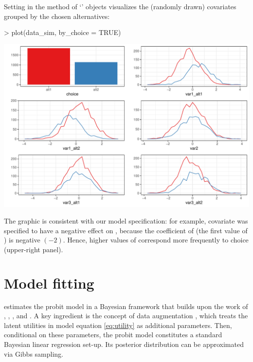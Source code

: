 \documentclass[article,shortnames]{jss}
\newcommand{\class}[1]{`\code{#1}'}
\newcommand{\fct}[1]{\code{#1()}}
\begin{document}
Setting  in the \fct{plot} method of \class{RprobitB\_data} objects visualizes the (randomly drawn) covariates grouped by the chosen alternatives:

\begin{Schunk}
\begin{Sinput}
> plot(data_sim, by_choice = TRUE)
\end{Sinput}
\end{Schunk}
\includegraphics{rprobitb_oelschlaeger_bauer-sim-data}

The graphic is consistent with our model specification: for example, covariate  was specified to have a negative effect on , because the coefficient of  (the first value of ) is negative $(-2)$. Hence, higher values of  correspond more frequently to choice  (upper-right panel).

\section{Model fitting} \label{sec:model_fitting}

 estimates the probit model in a Bayesian framework that builds upon the work of \cite{McCulloch:1994}, \cite{Nobile:1998}, \cite{Allenby:1998}, and \cite{Imai:2005}. A key ingredient is the concept of data augmentation \citep{Albert:1993}, which treats the latent utilities in model equation \eqref{eq:utility} as additional parameters. Then, conditional on these parameters, the probit model constitutes a standard Bayesian linear regression set-up. Its posterior distribution can be approximated via Gibbs sampling.
\end{document}
